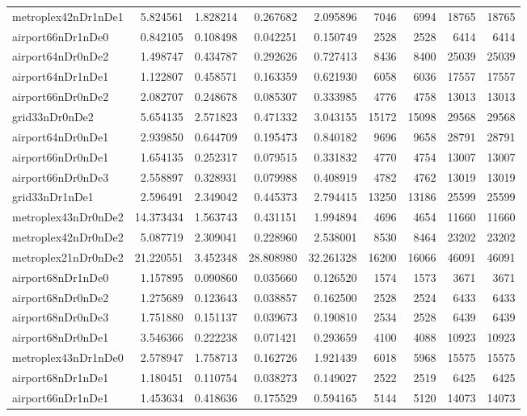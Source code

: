 \begin{longtable}{|l|r|r|r|r|r|r|r|r|}
metroplex42nDr1nDe1 & 5.824561 & 1.828214 & 0.267682 & 2.095896 & 7046 & 6994 & 18765 & 18765 \\
airport66nDr1nDe0 & 0.842105 & 0.108498 & 0.042251 & 0.150749 & 2528 & 2528 & 6414 & 6414 \\
airport64nDr0nDe2 & 1.498747 & 0.434787 & 0.292626 & 0.727413 & 8436 & 8400 & 25039 & 25039 \\
airport64nDr1nDe1 & 1.122807 & 0.458571 & 0.163359 & 0.621930 & 6058 & 6036 & 17557 & 17557 \\
airport66nDr0nDe2 & 2.082707 & 0.248678 & 0.085307 & 0.333985 & 4776 & 4758 & 13013 & 13013 \\
grid33nDr0nDe2 & 5.654135 & 2.571823 & 0.471332 & 3.043155 & 15172 & 15098 & 29568 & 29568 \\
airport64nDr0nDe1 & 2.939850 & 0.644709 & 0.195473 & 0.840182 & 9696 & 9658 & 28791 & 28791 \\
airport66nDr0nDe1 & 1.654135 & 0.252317 & 0.079515 & 0.331832 & 4770 & 4754 & 13007 & 13007 \\
airport66nDr0nDe3 & 2.558897 & 0.328931 & 0.079988 & 0.408919 & 4782 & 4762 & 13019 & 13019 \\
grid33nDr1nDe1 & 2.596491 & 2.349042 & 0.445373 & 2.794415 & 13250 & 13186 & 25599 & 25599 \\
metroplex43nDr0nDe2 & 14.373434 & 1.563743 & 0.431151 & 1.994894 & 4696 & 4654 & 11660 & 11660 \\
metroplex42nDr0nDe2 & 5.087719 & 2.309041 & 0.228960 & 2.538001 & 8530 & 8464 & 23202 & 23202 \\
metroplex21nDr0nDe2 & 21.220551 & 3.452348 & 28.808980 & 32.261328 & 16200 & 16066 & 46091 & 46091 \\
airport68nDr1nDe0 & 1.157895 & 0.090860 & 0.035660 & 0.126520 & 1574 & 1573 & 3671 & 3671 \\
airport68nDr0nDe2 & 1.275689 & 0.123643 & 0.038857 & 0.162500 & 2528 & 2524 & 6433 & 6433 \\
airport68nDr0nDe3 & 1.751880 & 0.151137 & 0.039673 & 0.190810 & 2534 & 2528 & 6439 & 6439 \\
airport68nDr0nDe1 & 3.546366 & 0.222238 & 0.071421 & 0.293659 & 4100 & 4088 & 10923 & 10923 \\
metroplex43nDr1nDe0 & 2.578947 & 1.758713 & 0.162726 & 1.921439 & 6018 & 5968 & 15575 & 15575 \\
airport68nDr1nDe1 & 1.180451 & 0.110754 & 0.038273 & 0.149027 & 2522 & 2519 & 6425 & 6425 \\
airport66nDr1nDe1 & 1.453634 & 0.418636 & 0.175529 & 0.594165 & 5144 & 5120 & 14073 & 14073 \\

\end{longtable}
